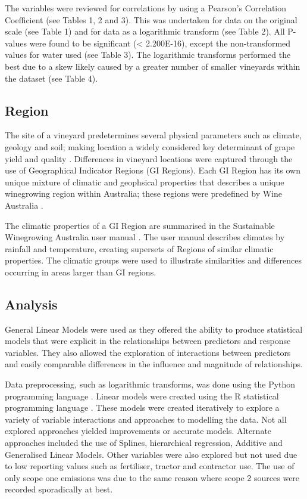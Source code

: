 \documentclass[12pt,australian]{article}
\begin{document}
\begin{sloppypar}
The variables were reviewed for correlations by using a Pearson's Correlation Coefficient (see Tables 1, 2 and 3). This was undertaken for data on the original scale (see Table 1) and for data as a logarithmic transform (see Table 2). All P-values were found to be significant (< 2.200E-16), except the non-transformed values for water used (see Table 3). The logarithmic transforms performed the best due to a skew likely caused by a greater number of smaller vineyards within the dataset (see Table 4).

\subsection{Region}
The site of a vineyard predetermines several physical parameters such as climate, geology and soil; making location a widely considered key determinant of grape yield and quality \autocite{abbalDecisionSupportSystem2016,agostaRegionalClimateVariability2012,fragaMultivariateClusteringViticultural2017}. Differences in vineyard locations were captured through the use of Geographical Indicator Regions (GI Regions). Each GI Region has its own unique mixture of climatic and geophsical properties that describes a unique winegrowing region within Australia; these regions were predefined by Wine Australia \autocite{hallidayAustralianWineEncyclopedia2009,oliverReviewSoilPhysical2013,soarClimateDriversRed2008}.

The climatic properties of a GI Region are summarised in the Sustainable Winegrowing Australia user manual \autocite{swaSustainableWinegrowingAustralia2021}. The user manual describes climates by rainfall and temperature, creating supersets of Regions of similar climatic properties. The climatic groups were used to illustrate similarities and differences occurring in areas larger than GI regions.

\subsection{Analysis}
General Linear Models were used as they offered the ability to produce statistical models that were explicit in the relationships between predictors and response variables. They also allowed the exploration of interactions between predictors and easily comparable differences in the influence and magnitude of relationships.

Data preprocessing, such as logarithmic transforms, was done using the Python programming language \autocite{g.vanrossumPythonTutorialTechnical1995}. Linear models were created using the R statistical programming language \autocite{rcoreteamLanguageEnvironmentStatistical2021}. These models were created iteratively to explore a variety of variable interactions and approaches to modelling the data. Not all explored approaches yielded improvements or accurate models. Alternate approaches included the use of Splines, hierarchical regression, Additive and Generalised Linear Models. Other variables were also explored but not used due to low reporting values such as fertiliser, tractor and contractor use. The use of only scope one emissions was due to the same reason where scope 2 sources were recorded sporadically at best.


\end{sloppypar}
\end{document}
